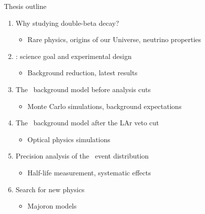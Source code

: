 \documentclass[10pt,aspectratio=169]{beamer}
\begin{document}
\begin{frame}{Thesis outline}
  \begin{enumerate}
    \item Why studying double-beta decay?
      \begin{itemize}
        \item Rare physics, origins of our Universe, neutrino properties
      \end{itemize}
    \item \gerda: science goal and experimental design
      \begin{itemize}
        \item Background reduction, latest results
      \end{itemize}
    \item The \gerda\ background model before analysis cuts
      \begin{itemize}
        \item Monte Carlo simulations, background expectations
      \end{itemize}
    \item The \gerda\ background model after the LAr veto cut
      \begin{itemize}
        \item Optical physics simulations
      \end{itemize}
    \item Precision analysis of the \nnbb\ event distribution
    \begin{itemize}
      \item Half-life measurement, systematic effects
    \end{itemize}
    \item Search for new physics
      \begin{itemize}
        \item Majoron models
      \end{itemize}
  \end{enumerate}
\end{frame}
\end{document}
